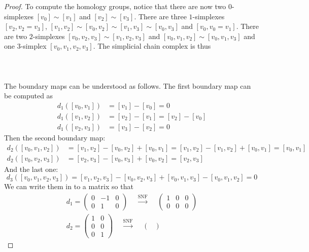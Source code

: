 \documentclass[a4paper]{article}
\begin{document}
\begin{ex}{}{}
\begin{proof}
To compute the homology groups, notice that there are now two $0$-simplexes $[v_0]\sim[v_1]$ and $[v_2]\sim[v_3]$. There are three $1$-simplexes $[v_2,v_2=v_3]$, $[v_1,v_2]\sim[v_0,v_2]\sim[v_1,v_3]\sim[v_0,v_3]$ and $[v_0,v_0=v_1]$. There are two $2$-simplexes $[v_0,v_2,v_3]\sim[v_1,v_2,v_3]$ and $[v_0,v_1,v_2]\sim[v_0,v_1,v_3]$ and one $3$-simplex $[v_0,v_1,v_2,v_3]$. The simplicial chain complex is thus \\~\\
\\~\\
The boundary maps can be understood as follows. The first boundary map can be computed as \begin{align*}
d_1([v_0,v_1])&=[v_1]-[v_0]=0\\
d_1([v_1,v_2])&=[v_2]-[v_1]=[v_2]-[v_0]\\
d_1([v_2,v_3])&=[v_3]-[v_2]=0
\end{align*}
Then the second boundary map: 
\begin{align*}
d_2([v_0,v_1,v_2])&=[v_1,v_2]-[v_0,v_2]+[v_0,v_1]=[v_1,v_2]-[v_1,v_2]+[v_0,v_1]=[v_0,v_1]\\
d_2([v_0,v_2,v_3])&=[v_2,v_3]-[v_0,v_3]+[v_0,v_2]=[v_2,v_3]
\end{align*}
And the last one: $$d_3([v_0,v_1,v_2,v_3])=[v_1,v_2,v_3]-[v_0,v_2,v_3]+[v_0,v_1,v_3]-[v_0,v_1,v_2]=0$$
We can write them in to a matrix so that 
\begin{gather*}
d_1=\begin{pmatrix}
0 & -1 & 0\\
0 & 1 & 0
\end{pmatrix}\;\;\;\;\overset{\text{SNF}}{\longrightarrow}\;\;\;\;\begin{pmatrix}
1 & 0 & 0\\
0 & 0 & 0
\end{pmatrix}\\
d_2=\begin{pmatrix}
1 & 0\\
0 & 0\\
0 & 1
\end{pmatrix}\;\;\;\;\overset{\text{SNF}}{\longrightarrow}\;\;\;\;\begin{pmatrix}

\end{pmatrix}
\end{gather*}
\end{proof}
\end{ex}
\end{document}
